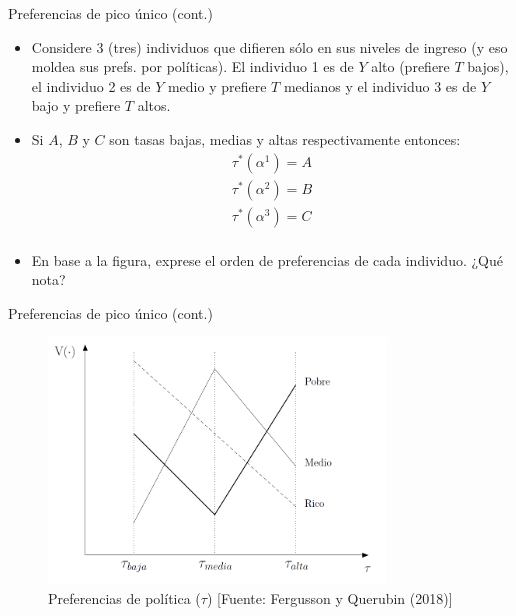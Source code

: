 \documentclass[
  ignorenonframetext,
]{beamer}
\providecommand{\tightlist}{%
  \setlength{\itemsep}{0pt}\setlength{\parskip}{0pt}}\usepackage{longtable,booktabs,array}
\begin{document}
\begin{frame}
\begin{block}{Preferencias de pico único (cont.)}
\protect\hypertarget{preferencias-de-pico-uxfanico-cont.}{}
\begin{itemize}
\tightlist
\item
  Considere 3 (tres) individuos que difieren sólo en sus niveles de
  ingreso (y eso moldea sus prefs. por políticas). El individuo 1 es de
  \(Y\) alto (prefiere \(T\) bajos), el individuo 2 es de \(Y\) medio y
  prefiere \(T\) medianos y el individuo 3 es de \(Y\) bajo y prefiere
  \(T\) altos.
\item
  Si \(A\), \(B\) y \(C\) son tasas bajas, medias y altas
  respectivamente entonces: \[\begin{aligned}
  \tau^{*}(\alpha^{1})=A \\
  \tau^{*}(\alpha^{2})=B \\
  \tau^{*}(\alpha^{3})=C \\
  \end{aligned}\]
\item
  En base a la figura, exprese el orden de preferencias de cada
  individuo. ¿Qué nota?
\end{itemize}
\end{block}

\begin{block}{Preferencias de pico único (cont.)}
\protect\hypertarget{preferencias-de-pico-uxfanico-cont.-1}{}
\begin{figure}

{\centering \includegraphics[width=0.8\textwidth,height=\textheight]{../epol/fig/fig-02-013.png}

}

\caption{Preferencias de política (\(\tau\)) {[}Fuente: Fergusson y
Querubin (2018){]}}

\end{figure}
\end{block}


\end{frame}
\end{document}
